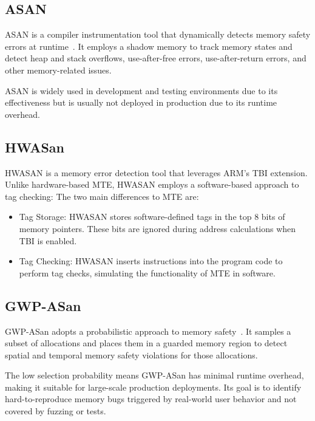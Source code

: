 \subsection{ASAN}
\label{subsec:related-asan}

\Acl{ASAN} is a compiler instrumentation tool that dynamically detects memory safety errors at runtime~\cite{serebryany2012addresssanitizer}.
It employs a shadow memory to track memory states and detect heap and stack overflows, use-after-free errors, use-after-return errors, and other memory-related issues.

\Ac{ASAN} is widely used in development and testing environments due to its effectiveness but is usually not deployed in production due to its runtime overhead.

\subsection{HWASan}
\label{subsec:hwasan}

\Acl{HWASAN} is a memory error detection tool that leverages ARM's \ac{TBI} extension.
Unlike hardware-based \ac{MTE}, \ac{HWASAN} employs a software-based approach to tag checking:
The two main differences to \ac{MTE} are:
\begin{itemize}
    \item Tag Storage: \ac{HWASAN} stores software-defined tags in the top 8 bits of memory pointers.
    These bits are ignored during address calculations when TBI is enabled.
    \item Tag Checking: \ac{HWASAN} inserts instructions into the program code to perform tag checks, simulating the functionality of \ac{MTE} in software.
\end{itemize}

\subsection{GWP-ASan}
\label{subsec:gwp-asan}

GWP-ASan adopts a probabilistic approach to memory safety~\cite{serebryany2023gwp}.
It samples a subset of allocations and places them in a guarded memory region to detect spatial and temporal memory safety violations for those allocations.

The low selection probability means GWP-ASan has minimal runtime overhead, making it suitable for large-scale production deployments.
Its goal is to identify hard-to-reproduce memory bugs triggered by real-world user behavior and not covered by fuzzing or tests.
